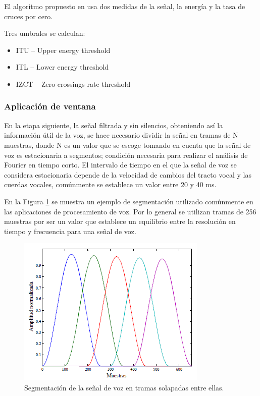 El algoritmo propuesto en \cite{Rabiner1975} usa dos medidas de la señal, la energía y la tasa de cruces por cero.

Tres umbrales se calculan:

\begin{itemize}
\item	ITU – Upper energy threshold
\item	ITL – Lower energy threshold
\item	IZCT – Zero crossings rate threshold
\end{itemize}

\subsubsection{Aplicación de ventana}

En la etapa siguiente, la señal filtrada y sin silencios, obteniendo así la información útil de la voz, se hace necesario dividir la señal en tramas de N muestras, donde N es un valor que se escoge tomando en cuenta que la señal de voz es estacionaria a segmentos; condición necesaria para realizar el análisis de Fourier en tiempo corto. El intervalo de tiempo en el que la señal de voz se considera estacionaria depende de la velocidad de cambios del tracto vocal y las cuerdas vocales, comúnmente se establece un valor entre 20 y 40 ms. \cite{SalcedoCherubini2006}

En la Figura \ref{fig:segmentacion} se muestra un ejemplo de segmentación utilizado comúnmente en las aplicaciones de procesamiento de voz. Por lo general se utilizan tramas de 256 muestras por ser un valor que establece un equilibrio entre la resolución en tiempo y frecuencia para una señal de voz.

\begin{figure}[H]
	\centering
	\includegraphics[width=0.6\linewidth]{figures/segmentacion}
	\caption{Segmentación de la señal de voz en tramas solapadas entre ellas.}
	\label{fig:segmentacion}
\end{figure}

